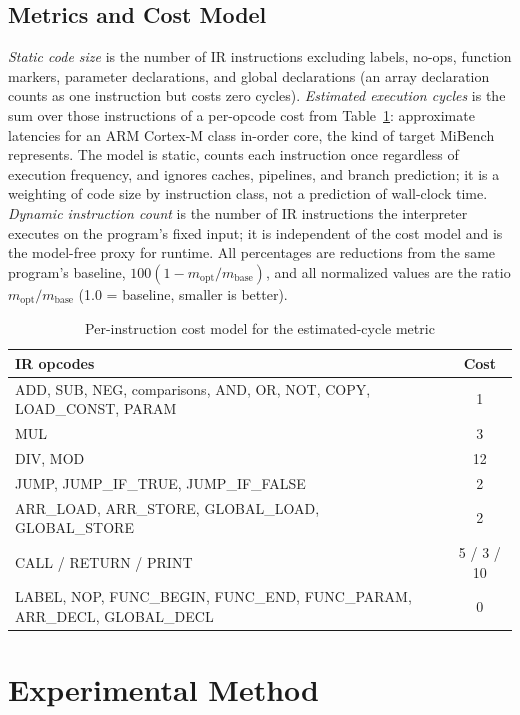 \documentclass[conference,a4paper]{IEEEtran}
\begin{document}
\subsection{Metrics and Cost Model}
\label{sec:metrics}
\textit{Static code size} is the number of IR instructions excluding labels, no-ops, function markers, parameter declarations, and global declarations (an array declaration counts as one instruction but costs zero cycles). \textit{Estimated execution cycles} is the sum over those instructions of a per-opcode cost from Table~\ref{tab:cost_model}: approximate latencies for an ARM Cortex-M class in-order core, the kind of target MiBench represents. The model is static, counts each instruction once regardless of execution frequency, and ignores caches, pipelines, and branch prediction; it is a weighting of code size by instruction class, not a prediction of wall-clock time. \textit{Dynamic instruction count} is the number of IR instructions the interpreter executes on the program's fixed input; it is independent of the cost model and is the model-free proxy for runtime. All percentages are reductions from the same program's baseline, $100 (1 - m_{\mathrm{opt}}/m_{\mathrm{base}})$, and all normalized values are the ratio $m_{\mathrm{opt}}/m_{\mathrm{base}}$ (1.0 = baseline, smaller is better).

\begin{table}[!htbp]
\centering
\caption{Per-instruction cost model for the estimated-cycle metric}
\label{tab:cost_model}
\renewcommand{\arraystretch}{1.05}
{\footnotesize
\begin{tabularx}{\columnwidth}{@{}>{\raggedright\arraybackslash}Xc@{}}
\toprule
\textbf{IR opcodes} & \textbf{Cost} \\
\midrule
ADD, SUB, NEG, comparisons, AND, OR, NOT, COPY, LOAD\_CONST, PARAM & 1 \\
MUL & 3 \\
DIV, MOD & 12 \\
JUMP, JUMP\_IF\_TRUE, JUMP\_IF\_FALSE & 2 \\
ARR\_LOAD, ARR\_STORE, GLOBAL\_LOAD, GLOBAL\_STORE & 2 \\
CALL / RETURN / PRINT & 5 / 3 / 10 \\
LABEL, NOP, FUNC\_BEGIN, FUNC\_END, FUNC\_PARAM, ARR\_DECL, GLOBAL\_DECL & 0 \\
\bottomrule
\end{tabularx}
}
\end{table}

\section{Experimental Method}
\label{sec:setup}
\end{document}

